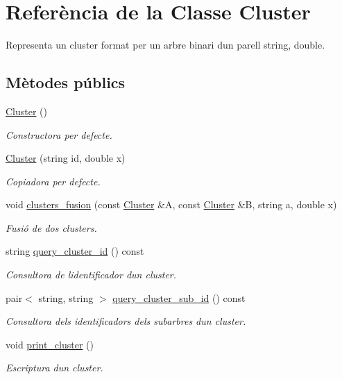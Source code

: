 \hypertarget{class_cluster}{}\section{Referència de la Classe Cluster}
\label{class_cluster}


Representa un cluster format per un arbre binari d\textquotesingle{}un parell string, double.  


\subsection*{Mètodes públics}
\begin{DoxyCompactItemize}
\item 
\hyperlink{class_cluster_aee7feb1d599d4c8fda6c3ee83e86ba81}{Cluster} ()
\begin{DoxyCompactList}\small\item\em Constructora per defecte. \end{DoxyCompactList}\item 
\hyperlink{class_cluster_a816d3dca3b1b678a28af2d31e8fc7e65}{Cluster} (string id, double x)
\begin{DoxyCompactList}\small\item\em Copiadora per defecte. \end{DoxyCompactList}\item 
void \hyperlink{class_cluster_a6b25af7d4f702db942878dba136fe0c2}{clusters\+\_\+fusion} (const \hyperlink{class_cluster}{Cluster} \&A, const \hyperlink{class_cluster}{Cluster} \&B, string a, double x)
\begin{DoxyCompactList}\small\item\em Fusió de dos clusters. \end{DoxyCompactList}\item 
string \hyperlink{class_cluster_a7e077596f7eb4f2bdf2847d65fa37654}{query\+\_\+cluster\+\_\+id} () const
\begin{DoxyCompactList}\small\item\em Consultora de l\textquotesingle{}identificador d\textquotesingle{}un cluster. \end{DoxyCompactList}\item 
pair$<$ string, string $>$ \hyperlink{class_cluster_ae8c8a1d94203dccfd6fbbc5389a1e0ec}{query\+\_\+cluster\+\_\+sub\+\_\+id} () const
\begin{DoxyCompactList}\small\item\em Consultora dels identificadors dels subarbres d\textquotesingle{}un cluster. \end{DoxyCompactList}\item 
void \hyperlink{class_cluster_ad4607d22299a7b2b2cc271300166da47}{print\+\_\+cluster} ()
\begin{DoxyCompactList}\small\item\em Escriptura d\textquotesingle{}un cluster. \end{DoxyCompactList}\end{DoxyCompactItemize}
